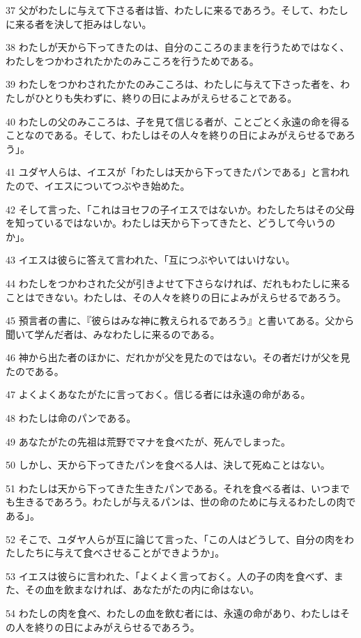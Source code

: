 \par 37 父がわたしに与えて下さる者は皆、わたしに来るであろう。そして、わたしに来る者を決して拒みはしない。
\par 38 わたしが天から下ってきたのは、自分のこころのままを行うためではなく、わたしをつかわされたかたのみこころを行うためである。
\par 39 わたしをつかわされたかたのみこころは、わたしに与えて下さった者を、わたしがひとりも失わずに、終りの日によみがえらせることである。
\par 40 わたしの父のみこころは、子を見て信じる者が、ことごとく永遠の命を得ることなのである。そして、わたしはその人々を終りの日によみがえらせるであろう」。
\par 41 ユダヤ人らは、イエスが「わたしは天から下ってきたパンである」と言われたので、イエスについてつぶやき始めた。
\par 42 そして言った、「これはヨセフの子イエスではないか。わたしたちはその父母を知っているではないか。わたしは天から下ってきたと、どうして今いうのか」。
\par 43 イエスは彼らに答えて言われた、「互につぶやいてはいけない。
\par 44 わたしをつかわされた父が引きよせて下さらなければ、だれもわたしに来ることはできない。わたしは、その人々を終りの日によみがえらせるであろう。
\par 45 預言者の書に、『彼らはみな神に教えられるであろう』と書いてある。父から聞いて学んだ者は、みなわたしに来るのである。
\par 46 神から出た者のほかに、だれかが父を見たのではない。その者だけが父を見たのである。
\par 47 よくよくあなたがたに言っておく。信じる者には永遠の命がある。
\par 48 わたしは命のパンである。
\par 49 あなたがたの先祖は荒野でマナを食べたが、死んでしまった。
\par 50 しかし、天から下ってきたパンを食べる人は、決して死ぬことはない。
\par 51 わたしは天から下ってきた生きたパンである。それを食べる者は、いつまでも生きるであろう。わたしが与えるパンは、世の命のために与えるわたしの肉である」。
\par 52 そこで、ユダヤ人らが互に論じて言った、「この人はどうして、自分の肉をわたしたちに与えて食べさせることができようか」。
\par 53 イエスは彼らに言われた、「よくよく言っておく。人の子の肉を食べず、また、その血を飲まなければ、あなたがたの内に命はない。
\par 54 わたしの肉を食べ、わたしの血を飲む者には、永遠の命があり、わたしはその人を終りの日によみがえらせるであろう。
